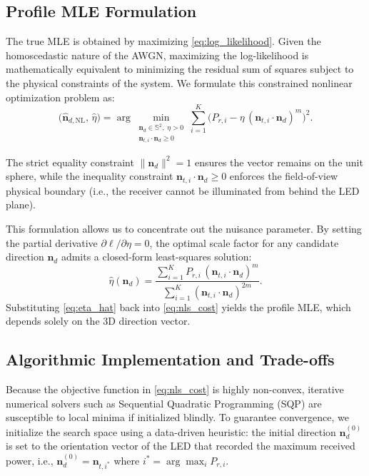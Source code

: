 \documentclass[journal]{IEEEtran}
\begin{document}
\subsection{Profile MLE Formulation}

The true MLE is obtained by maximizing \eqref{eq:log_likelihood}. Given the homoscedastic nature of the AWGN, maximizing the log-likelihood is mathematically equivalent to minimizing the residual sum of squares subject to the physical constraints of the system. We formulate this constrained nonlinear optimization problem as:
\begin{equation}
  \bigl(\hat{\mathbf{n}}_{d,\text{NL}},\,\hat\eta\bigr)
  = \arg\min_{\substack{\mathbf{n}_d\in\mathbb{S}^{2},\;\eta>0 \\
                         \mathbf{n}_{t,i}\cdot\mathbf{n}_d\ge0}}
    \sum_{i=1}^{K}
    \bigl(P_{r,i} - \eta\,(\mathbf{n}_{t,i}\cdot\mathbf{n}_d)^{m}\bigr)^{2}.
  \label{eq:nls_cost}
\end{equation}

The strict equality constraint $\|\mathbf{n}_d\|^2 = 1$ ensures the vector remains on the unit sphere, while the inequality constraint $\mathbf{n}_{t,i}\cdot\mathbf{n}_d\ge0$ enforces the field-of-view physical boundary (i.e., the receiver cannot be illuminated from behind the LED plane). 

This formulation allows us to concentrate out the nuisance parameter. By setting the partial derivative $\partial \ell / \partial \eta = 0$, the optimal scale factor for any candidate direction $\mathbf{n}_d$ admits a closed-form least-squares solution:
\begin{equation}
  \hat\eta(\mathbf{n}_d)
  = \frac{\displaystyle\sum_{i=1}^{K} P_{r,i}\,
    (\mathbf{n}_{t,i}\cdot\mathbf{n}_d)^{m}}
   {\displaystyle\sum_{i=1}^{K}
    (\mathbf{n}_{t,i}\cdot\mathbf{n}_d)^{2m}}.
  \label{eq:eta_hat}
\end{equation}
Substituting \eqref{eq:eta_hat} back into \eqref{eq:nls_cost} yields the profile MLE, which depends solely on the 3D direction vector.

\subsection{Algorithmic Implementation and Trade-offs}

Because the objective function in \eqref{eq:nls_cost} is highly non-convex, iterative numerical solvers such as Sequential Quadratic Programming (SQP) are susceptible to local minima if initialized blindly. To guarantee convergence, we initialize the search space using a data-driven heuristic: the initial direction $\mathbf{n}_{d}^{(0)}$ is set to the orientation vector of the LED that recorded the maximum received power, i.e., $\mathbf{n}_{d}^{(0)} = \mathbf{n}_{t, i^*}$ where $i^* = \arg\max_i P_{r,i}$.
\end{document}
